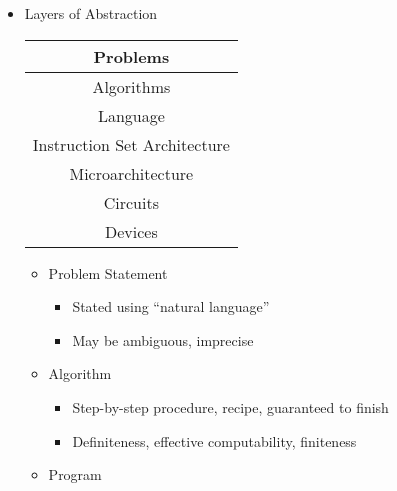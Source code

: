 \begin{itemize}
\begin{itemize}
\begin{itemize}
        \end{itemize}

    \end{itemize}

  \item Layers of Abstraction

    \begin{center}
      \begin{tabular}[h]{|c|}
        \hline
        Problems\\
        \hline
        Algorithms\\
        \hline
        Language\\
        \hline
        Instruction Set Architecture\\
        \hline
        Microarchitecture\\
        \hline
        Circuits\\
        \hline
        Devices\\
        \hline
      \end{tabular}
    \end{center}

    \begin{itemize}

      \item Problem Statement

        \begin{itemize}

          \item Stated using ``natural language''

          \item May be ambiguous, imprecise

        \end{itemize}

      \item Algorithm

        \begin{itemize}

          \item Step-by-step procedure, recipe, guaranteed to finish

          \item Definiteness, effective computability, finiteness

        \end{itemize}

      \item Program

        \begin{itemize}


\end{itemize}
\end{itemize}
\end{itemize}
